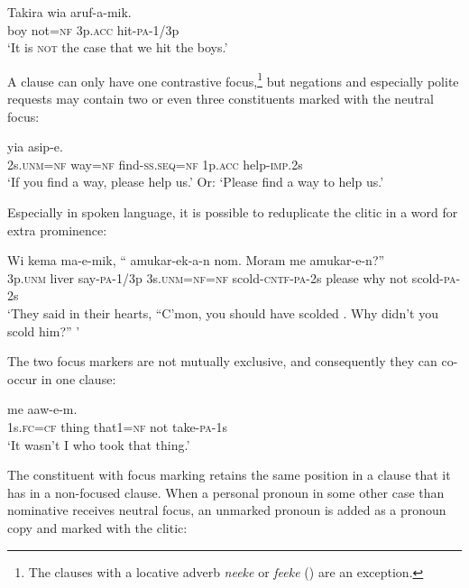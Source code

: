\ea%
\label{ex:x1728}
\gll Takira    wia  aruf-a-mik. \\
boy  not=\textsc{nf}  3p.\textsc{acc}  hit-\textsc{pa}-1/3p      \\
\glt`It is \textsc{not} the case that we hit the boys.'
\z


A clause can only have one contrastive focus,\footnote{The clauses with a locative adverb \textit{neeke} or \textit{feeke} () are an exception.}  but negations and especially polite requests may contain two or even three constituents marked with the neutral focus:

\ea%
\label{ex:x1729}
\gll {}    yia  asip-e.\\
2s.\textsc{unm}=\textsc{nf}  way=\textsc{nf}  find-\textsc{ss}.\textsc{seq}=\textsc{nf}  1p.\textsc{acc}  help-\textsc{imp}.2s\\
\glt`If you find a way, please help us.' Or: `Please find a way to help us.'
\z


Especially in spoken language, it is possible to reduplicate the  clitic in a word for extra prominence:

\ea%
\label{ex:x1731}
\gll Wi  kema  ma-e-mik,  ``  amukar-ek-a-n nom.  Moram  me  amukar-e-n?''  \\
3p.\textsc{unm}  liver  say-\textsc{pa}-1/3p  3s.\textsc{unm}=\textsc{nf}=\textsc{nf}  scold-\textsc{cntf}-\textsc{pa}-2s please  why  not  scold-\textsc{pa}-2s\\
\glt`They said in their hearts, ``C'mon, you should have scolded . Why didn't you scold him?'' '
\z


The two focus markers are not mutually exclusive, and consequently they can co-occur in one clause:

\ea%
\label{ex:x1737}
\gll {}    me  aaw-e-m.\\
1s.\textsc{fc}=\textsc{cf}  thing  that1=\textsc{nf}  not  take-\textsc{pa}-1s\\
\glt`It wasn't I who took that thing.'
\z


The constituent with focus marking retains the same position in a clause that it has in a non-focused clause. When a personal pronoun in some other case than nominative receives neutral focus, an unmarked pronoun is added as a pronoun copy and marked with the  clitic:

